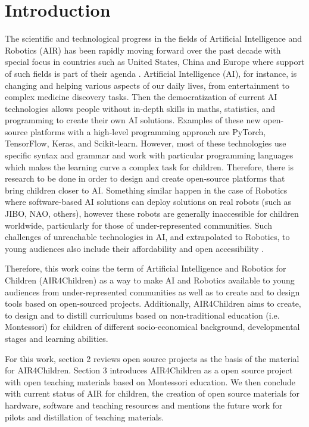 \documentclass[sigconf]{acmart}
\begin{document}
\section{Introduction} 
The scientific and technological progress in the fields of Artificial Intelligence and Robotics (AIR) has been rapidly moving forward over the past decade with special focus in countries such as United States, China and Europe where support of such fields is part of their agenda \cite{Savage2020}. 
Artificial Intelligence (AI), for instance, is changing and helping various aspects of our daily lives, from entertainment to complex medicine discovery tasks. 
Then the democratization of current AI technologies allows people without in-depth skills in maths, statistics, and programming to create their own AI solutions. Examples of these new open-source platforms with a high-level programming approach are PyTorch, TensorFlow, Keras, and Scikit-learn. 
However, most of these technologies use specific syntax and grammar and work with particular programming languages which makes the learning curve a complex task for children. 
Therefore, there is research to be done in order to design and create open-source platforms that bring children closer to AI.
Something similar happen in the case of Robotics where software-based AI solutions can deploy solutions on real robots (such as JIBO, NAO, others), however these robots are generally inaccessible for children worldwide, particularly for those of under-represented communities.
Such challenges of unreachable technologies in AI, and extrapolated to Robotics, to young audiences 
also include their affordability and open accessibility \cite{UNICEF2020}.

Therefore, this work coins the term of Artificial Intelligence and Robotics for Children (AIR4Children) as a way to make AI and Robotics available to young audiences from under-represented communities as well as to create and to design tools based on open-sourced projects.
Additionally, AIR4Children aims to create, to design and to distill curriculums based on non-traditional education (i.e. Montessori) for children of different socio-economical background, developmental stages and learning abilities. 

For this work, section 2 reviews open source projects as the basis of the material for AIR4Children.
Section 3 introduces AIR4Children as a open source project with open teaching materials based on Montessori education. 
We then conclude with current status of AIR for children, the creation of open source materials for hardware, software and teaching resources and mentions the future work for pilots and distillation of teaching materials.
\end{document}
